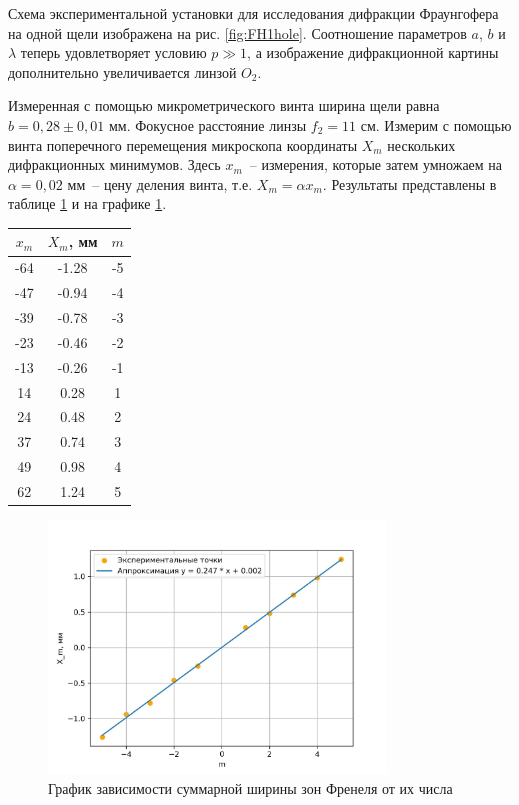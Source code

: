 \documentclass[a4paper,12pt]{article} %
\begin{document}
Схема экспериментальной установки для исследования дифракции Фраунгофера на одной щели изображена на рис. \ref{fig:FH1hole}. Соотношение параметров $a$, $b$ и $\lambda$ теперь удовлетворяет условию $p\gg 1$, а изображение дифракционной картины дополнительно увеличивается линзой $O_2$.

Измеренная с помощью микрометрического винта ширина щели равна $ b =  0,28 \pm 0,01 $ мм. Фокусное расстояние линзы $ f_2 = 11 $ см. Измерим с помощью винта поперечного перемещения микроскопа координаты $ X_m $ нескольких дифракционных минимумов. Здесь $ x_m $~-- измерения, которые затем умножаем на $ \alpha = 0,02 $ мм~-- цену деления винта, т.е. $ X_m = \alpha x_m $.
 Результаты представлены в таблице \ref{tab:tab} и на графике \ref{A}. 
 
\begin{table}[]
    \centering
		\begin{tabular}{|c|c|c|}
			\hline
			$ x_m $ & $ X_m $, мм & $ m $ \\
			\hline
                -64 & -1.28 & -5\\
			-47 & -0.94 & -4\\
			-39 & -0.78 & -3\\
			-23 & -0.46 & -2\\
			-13 & -0.26 & -1\\
			14 & 0.28 & 1\\
			24 & 0.48 & 2\\
			37 & 0.74 & 3\\
			49 & 0.98 & 4\\ 
                62 & 1.24 & 5\\
			\hline
		\end{tabular}
  \label{tab:tab}
\end{table}

\begin{figure}[h!]
    \centering
    \includegraphics[width = 0.8\textwidth]{B.jpg}
    \caption{График зависимости суммарной ширины зон Френеля от их числа}
    \label{A}
\end{figure}
\end{document}

